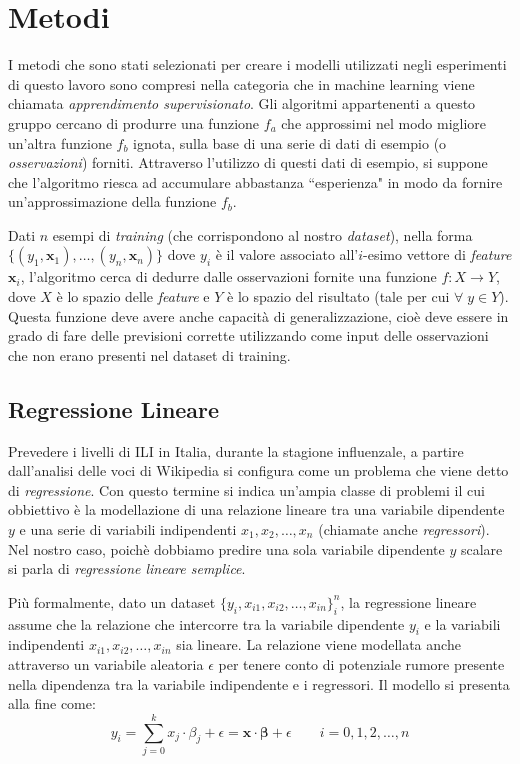 \newcommand{\norm}[1]{\left\lVert#1\right\rVert} %

\chapter{Metodi}
\bigskip
I metodi che sono stati selezionati per creare i modelli utilizzati negli esperimenti di questo lavoro sono compresi nella 
categoria che in machine learning viene chiamata \textit{apprendimento supervisionato}. Gli algoritmi appartenenti a questo 
gruppo cercano di produrre una funzione $f_a$ che approssimi nel modo migliore un'altra funzione $f_b$ ignota, sulla base di
una serie di dati di esempio (o \textit{osservazioni}) forniti. Attraverso l'utilizzo di questi dati di esempio, si suppone
che l'algoritmo riesca ad accumulare abbastanza ``esperienza" in modo da fornire un'approssimazione della funzione $f_b$. 
\bigskip

Dati $n$ esempi di \textit{training} (che corrispondono al nostro \textit{dataset}), nella forma $\{(y_1, \bm{x}_1), \ldots, (y_n, \bm{x}_n)\}$ dove $y_i$ è il valore associato all'$i$-esimo vettore di \textit{feature} $\bm{x}_i$, l'algoritmo cerca di 
dedurre dalle osservazioni fornite una funzione $f: X \rightarrow Y$, dove $X$ è lo spazio delle \textit{feature} e $Y$ è lo 
spazio del risultato (tale per cui $\forall \; y \in Y$). Questa funzione deve avere anche capacità di generalizzazione, cioè 
deve essere in grado di fare delle previsioni corrette utilizzando come input delle osservazioni che non erano presenti nel 
dataset di training.

\section{Regressione Lineare}
\bigskip

Prevedere i livelli di ILI in Italia, durante la stagione influenzale, a partire dall'analisi delle voci di Wikipedia si 
configura come un problema che viene detto di \textit{regressione}. Con questo termine si indica 
un'ampia classe di problemi il cui obbiettivo è la modellazione di una relazione lineare tra una variabile dipendente $y$ e 
una serie di variabili indipendenti ${x_1, x_2, \ldots, x_n}$ (chiamate anche \textit{regressori}). Nel nostro caso, poichè 
dobbiamo predire una sola variabile dipendente $y$ scalare si parla di \textit{regressione lineare semplice}. 
\bigskip

Più formalmente, dato un dataset $\{ y_i, x_{i1}, x_{i2},\ldots, x_{in}\}^n_i$, la regressione lineare assume che la 
relazione che intercorre tra la variabile dipendente $y_i$ e la variabili indipendenti ${x_{i1}, x_{i2},\ldots, x_{in}}$ sia 
lineare. La relazione viene modellata anche attraverso un variabile aleatoria $\epsilon$ per tenere conto di potenziale 
rumore presente nella dipendenza tra la variabile indipendente e i regressori. Il modello si presenta alla fine come:
\begin{equation}
y_i = \sum_{j=0}^k x_j \cdot \beta_j + \epsilon = \bm{x\cdot\beta}+\epsilon \qquad i=0,1,2,\ldots ,n
\end{equation}

